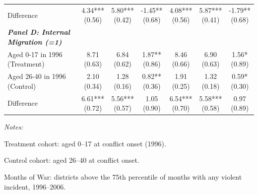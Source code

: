 \begin{landscape}
\begin{table}[!h]
{\begin{threeparttable}
\begin{tabular}[t]{lcccccc}
Difference & \makecell[c]{4.34*** \\ (0.56)} & \makecell[c]{5.80*** \\ (0.42)} & \makecell[c]{-1.45** \\ (0.68)} & \makecell[c]{4.08*** \\ (0.56)} & \makecell[c]{5.87*** \\ (0.41)} & \makecell[c]{-1.79** \\ (0.68)}\\
\em{\textbf{Panel D: Internal Migration (=1)}} & \em{\textbf{}} & \em{\textbf{}} & \em{\textbf{}} & \em{\textbf{}} & \em{\textbf{}} & \em{\textbf{}}\\
Aged 0-17 in 1996 (Treatment) & \makecell[c]{8.71 \\ (0.63)} & \makecell[c]{6.84 \\ (0.62)} & \makecell[c]{1.87** \\ (0.86)} & \makecell[c]{8.46 \\ (0.66)} & \makecell[c]{6.90 \\ (0.63)} & \makecell[c]{1.56* \\ (0.89)}\\
Aged 26-40 in 1996 (Control) & \makecell[c]{2.10 \\ (0.34)} & \makecell[c]{1.28 \\ (0.16)} & \makecell[c]{0.82** \\ (0.36)} & \makecell[c]{1.91 \\ (0.25)} & \makecell[c]{1.32 \\ (0.18)} & \makecell[c]{0.59* \\ (0.30)}\\
\addlinespace
Difference & \makecell[c]{6.61*** \\ (0.72)} & \makecell[c]{5.56*** \\ (0.57)} & \makecell[c]{1.05 \\ (0.90)} & \makecell[c]{6.54*** \\ (0.70)} & \makecell[c]{5.58*** \\ (0.58)} & \makecell[c]{0.97 \\ (0.89)}\\
\bottomrule
\end{tabular}
\begin{tablenotes}
\item \textit{Notes:} 
\item Treatment cohort: aged 0--17 at conflict onset (1996).
\item Control cohort: aged 26--40 at conflict onset.
\item Months of War: districts above the 75th percentile of months with any violent incident, 1996--2006.

\end{tablenotes}
\end{threeparttable}}
\end{table}
\end{landscape}
